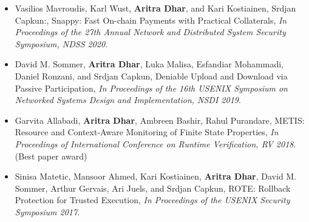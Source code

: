  \begin{itemize}
   \item Vasilios Mavroudis, Karl Wust, \textbf{Aritra Dhar}, and Kari Kostiainen, Srdjan Capkun:, Snappy: Fast On-chain Payments with Practical Collaterals, \emph{In Proceedings of the 27th Annual Network and Distributed System Security Symposium, NDSS 2020}. 
   \item David M. Sommer, \textbf{Aritra Dhar}, Luka Malisa, Esfandiar Mohammadi, Daniel Ronzani, and Srdjan Capkun, Deniable Upload and Download via Passive Participation, \emph{In Proceedings of the 16th USENIX Symposium on Networked Systems Design and Implementation, NSDI 2019}.
   \item Garvita Allabadi, \textbf{Aritra Dhar}, Ambreen Bashir, Rahul Purandare, METIS: Resource and Context-Aware Monitoring of Finite State Properties, \emph{In Proceedings of International Conference on Runtime Verification, RV 2018}. (Best paper award)
   \item Sinisa Matetic, Mansoor Ahmed, Kari Kostiainen, \textbf{Aritra Dhar}, David M. Sommer, Arthur Gervais, Ari Juels, and Srdjan Capkun, ROTE: Rollback Protection for Trusted Execution, \emph{In Proceedings of the USENIX Security Symposium 2017}.
 \end{itemize}